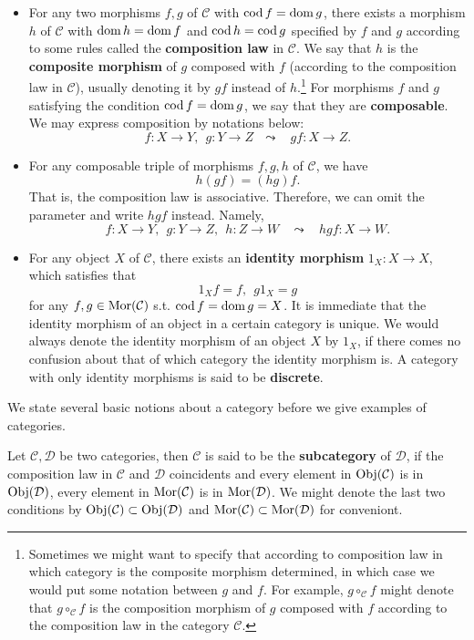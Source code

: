 \begin{definition}[Category]
\begin{itemize}
			\item For any two morphisms $f,g$ of $\mathcal{C}$ with $\operatorname{cod} f=\operatorname{dom} g$, there exists a morphism $h$ of $\mathcal{C}$ with $\operatorname{dom} h=\operatorname{dom} f$ and $\operatorname{cod} h=\operatorname{cod} g$ specified by $f$ and $g$ according to some rules called the \textbf{composition law} in $\mathcal{C}$. We say that $h$ is the \textbf{composite morphism} of $g$ composed with $f$ (according to the composition law in $\mathcal{C}$), usually denoting it by $gf$ instead of $h$.\footnote{Sometimes we might want to specify that according to composition law in which category is the composite morphism determined, in which case we would put some notation between $g$ and $f$. For example, $g\circ_\mathcal{C} f$ might denote that $g\circ_\mathcal{C} f$ is the composition morphism of $g$ composed with $f$ according to the composition law in the category $\mathcal{C}$.} For morphisms $f$ and $g$ satisfying the condition $\operatorname{cod} f=\operatorname{dom} g$, we say that they are \textbf{composable}. We may express composition by notations below:
				\[f:X\to Y,\ \ g:Y\to Z\ \ \ \leadsto\ \ \ \ gf:X\to Z.\]
			\item For any composable triple of morphisms $f,g,h$ of $\mathcal{C}$, we have
				\[h(gf)=(hg)f.\]
			That is, the composition law is associative. Therefore, we can omit the parameter and write $hgf$ instead. Namely,
				\[f:X\to Y,\ \ g:Y\to Z,\ \ h:Z\to W\ \ \ \ \leadsto\ \ \ \ hgf:X\to W.\]
			\item For any object $X$ of $\mathcal{C}$, there exists an \textbf{identity morphism} $1_X:X\to X$, which satisfies that
			\[1_Xf=f,\ \ g1_X=g\]
			for any $f,g\in \operatorname{Mor}(\mathcal{C})$ s.t. $\operatorname{cod} f=\operatorname{dom} g=X$. It is immediate that the identity morphism of an object in a certain category is unique. We would always denote the identity morphism of an object $X$ by $1_X$, if there comes no confusion about that of which category the identity morphism is. A category with only identity morphisms is said to be \textbf{discrete}.
		\end{itemize}
	\end{definition}
We state several basic notions about a category before we give examples of categories.
	\begin{definition}[Subcategory]
	Let $\mathcal{C},\mathcal{D}$ be two categories, then $\mathcal{C}$ is said to be the \textbf{subcategory} of $\mathcal{D}$, if the composition law in $\mathcal{C}$ and $\mathcal{D}$ coincidents and every element in $\operatorname{Obj}(\mathcal{C})$ is in $\operatorname{Obj}(\mathcal{D})$, every element in $\operatorname{Mor}(\mathcal{C})$ is in $\operatorname{Mor}(\mathcal{D})$. We might denote the last two conditions by $\operatorname{Obj}(\mathcal{C})\subset\operatorname{Obj}(\mathcal{D})$ and $\operatorname{Mor}(\mathcal{C})\subset\operatorname{Mor}(\mathcal{D})$ for conveniont.
	\end{definition}

